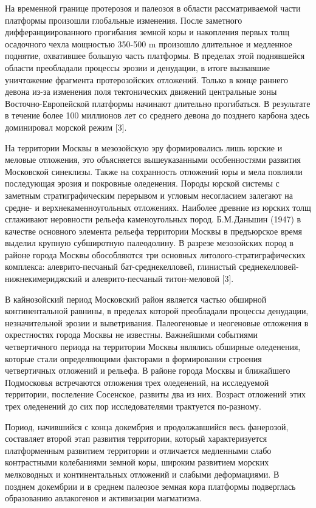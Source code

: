 На временной границе протерозоя и палеозоя в области рассматриваемой части платформы 
произошли глобальные изменения. После заметного 
дифферанциированного прогибания земной коры и накопления первых толщ осадочного чехла
мощностью 350-500 \si{\meter} произошло длительное и медленное поднятие, охватившее
большую часть платформы. В пределах этой поднявшейся области преобладали процессы 
эрозии и денудации, в итоге вызвавшие уничтожение фрагмента протерозойских отложений. 
Только в конце раннего девона из-за изменения поля тектонических движений центральные 
зоны Восточно-Европейской платформы
начинают длительно прогибаться. В результате в течение более 100 миллионов лет 
со среднего девона до позднего карбона здесь доминировал морской режим [3].

На территории Москвы в мезозойскую эру формировались лишь юрские и меловые отложения, это объясняется 
вышеуказанными особенностями развития Московской синеклизы. Также на сохранность 
отложений юры и мела повлияли последующая эрозия и покровные оледенения.
Породы юрской системы с заметным стратиграфическим перерывом и угловым несогласием залегают 
на средне- и верхнекаменноугольных отложениях. Наиболее древние из юрских толщ 
сглаживают неровности рельефа каменоугольных пород. Б.М.Даньшин (1947) в качестве 
основного элемента рельефа территории Москвы в предъюрское время выделил крупную 
субширотную палеодолину. В разрезе мезозойских пород в районе города Москвы 
обособляются три основных литолого-стратиграфических комплекса: алеврито-песчаный 
бат-среднекелловей, глинистый среднекелловей-нижнекимериджский и алеврито-песчаный 
титон-меловой [3].

В кайнозойский период Московский район является частью обширной континентальной равнины,
в пределах которой преобладали процессы денудации, незначительной эрозии и выветривания.
Палеогеновые и неогеновые отложения в окрестностях города Москвы не известны.
Важнейшими событиями четвертичного периода на территории Москвы являлись 
обширные оледенения, которые стали определяющими факторами в формировании 
строения четвертичных отложений и рельефа. В районе города Москвы и ближайшего 
Подмосковья встречаются отложения трех оледенений, на исследуемой территории,
послеление Сосенское, развиты два из них. Возраст отложений этих трех оледенений 
до сих пор исследователями трактуется по-разному. 

Пориод, начившийся с конца докембрия и продолжавшийся весь фанерозой, 
составляет второй этап развития 
территории, который характеризуется платформенным развитием территории и отличается 
медленными слабо контрастными колебаниями земной коры, широким развитием морских
мелководных и континентальных отложений и слабыми деформациями. В позднем докембрии 
и в среднем палеозое земная кора платформы подверглась образованию авлакогенов 
и активизации магматизма. 

